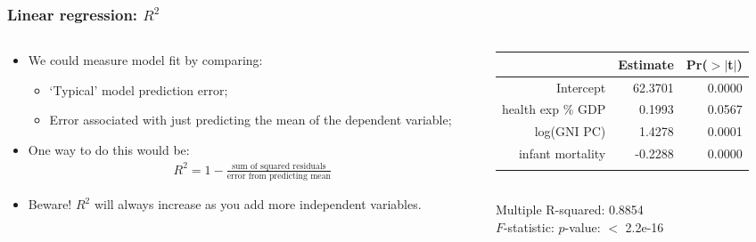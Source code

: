 \documentclass[aspectratio=169]{beamer}
\theoremstyle{principle}
\begin{document}
\begin{frame}
\frametitle{Linear regression: $R^2$}

\begin{columns}
\begin{column}{0.5\textwidth}

\begin{itemize}
\item We could measure model fit by comparing:
\begin{itemize}
\item `Typical' model prediction error;
\item Error associated with just predicting the mean of the dependent variable;
 \end{itemize}
\bigskip

\item One way to do this would be:
\begin{align*}
R^2 = 1 - \frac{\mbox{sum of squared residuals}}{\mbox{error from predicting mean}}
\end{align*}

\item[] \color{white}Beware!  $R^2$ will always increase as you add more independent variables.

\end{itemize}

\end{column}
\begin{column}{0.5\textwidth}

\begin{table}[ht]
\centering
\begin{tabular}{rrr}
  \hline
   \hline
 & Estimate & Pr($>$$|$t$|$) \\ 
  \hline
   \hline
Intercept & 62.3701 & 0.0000 \\ 
  health exp \% GDP & 0.1993 & 0.0567 \\ 
  log(GNI PC) & 1.4278 & 0.0001 \\ 
  infant mortality & -0.2288 & 0.0000 \\ 
   \hline
   \hline
   &&\\
\end{tabular}\\
Multiple R-squared:  0.8854\\ 
\color{white}$F$-statistic: $p$-value: $<$ 2.2e-16
\end{table}

\end{column}
\end{columns}

\end{frame}
\end{document}
